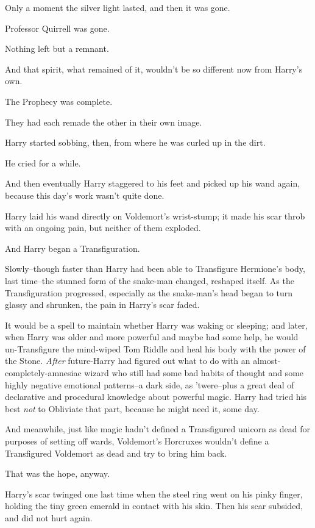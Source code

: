 Only a moment the silver light lasted, and then it was gone.

Professor Quirrell was gone.

Nothing left but a remnant.

And that spirit, what remained of it, wouldn't be so different now from Harry's own.

The Prophecy was complete.

They had each remade the other in their own image.

Harry started sobbing, then, from where he was curled up in the dirt.

He cried for a while.

And then eventually Harry staggered to his feet and picked up his wand again, because this day's work wasn't quite done.

\later

Harry laid his wand directly on Voldemort's wrist-stump; it made his scar throb with an ongoing pain, but neither of them exploded.

And Harry began a Transfiguration.

Slowly\---though faster than Harry had been able to Transfigure Hermione's body, last time\---the stunned form of the snake-man changed, reshaped itself. As the Transfiguration progressed, especially as the snake-man's head began to turn glassy and shrunken, the pain in Harry's scar faded.

It would be a spell to maintain whether Harry was waking or sleeping; and later, when Harry was older and more powerful and maybe had some help, he would un-Transfigure the mind-wiped Tom Riddle and heal his body with the power of the Stone. \emph{After} future-Harry had figured out what to do with an almost-completely-amnesiac wizard who still had some bad habits of thought and some highly negative emotional patterns\---a dark side, as 'twere\---plus a great deal of declarative and procedural knowledge about powerful magic. Harry had tried his best \emph{not} to Obliviate that part, because he might need it, some day.

And meanwhile, just like magic hadn't defined a Transfigured unicorn as dead for purposes of setting off wards, Voldemort's Horcruxes wouldn't define a Transfigured Voldemort as dead and try to bring him back.

That was the hope, anyway.

Harry's scar twinged one last time when the steel ring went on his pinky finger, holding the tiny green emerald in contact with his skin. Then his scar subsided, and did not hurt again.

